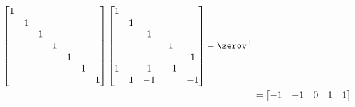 \documentclass{ctexart}
\begin{document}
\begin{example} 
\begin{align*}
\begin{bmatrix}
                                             1 &   &   &   &   &   &   \\
                                               & 1 &   &   &   &   &   \\
                                               &   & 1 &   &   &   &   \\
                                               &   &   & 1 &   &   &   \\
                                               &   &   &   & 1 &   &   \\
                                               &   &   &   &   & 1 &   \\
                                               &   &   &   &   &   & 1 \\
                                         \end{bmatrix} \begin{bmatrix}
                                                           1 &   &    &    &    \\
                                                             & 1 &    &    &    \\
                                                             &   & 1  &    &    \\
                                                             &   &    & 1  &    \\
                                                             &   &    &    & 1  \\
                                                           1 &   & 1  & -1 &    \\
                                                             & 1 & -1 &    & -1 \\
                                                       \end{bmatrix} - \zerov^\top \\
                       & = \begin{bmatrix}
                               -1 & -1 & 0 & 1 & 1
                           \end{bmatrix}
    \end{align*}


\end{example}
\end{document}

